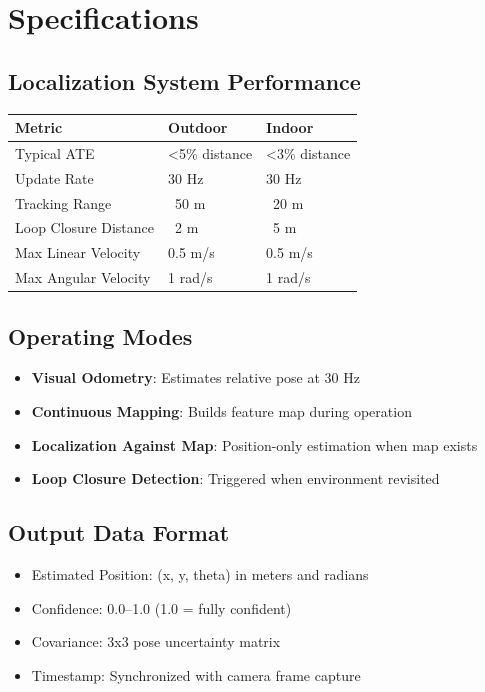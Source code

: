 %
%

\chapter{Specifications}

\section{Localization System Performance}

\begin{table}[h]
\centering
\begin{tabular}{|l|l|l|}
\hline
\textbf{Metric} & \textbf{Outdoor} & \textbf{Indoor} \\
\hline
Typical ATE & \textless 5\% distance & \textless 3\% distance \\
\hline
Update Rate & 30 Hz & 30 Hz \\
\hline
Tracking Range & ~50 m & ~20 m \\
\hline
Loop Closure Distance & ~2 m & ~5 m \\
\hline
Max Linear Velocity & 0.5 m/s & 0.5 m/s \\
\hline
Max Angular Velocity & 1 rad/s & 1 rad/s \\
\hline
\end{tabular}
\end{table}

\section{Operating Modes}

\begin{itemize}
    \item \textbf{Visual Odometry}: Estimates relative pose at 30 Hz
    \item \textbf{Continuous Mapping}: Builds feature map during operation
    \item \textbf{Localization Against Map}: Position-only estimation when map exists
    \item \textbf{Loop Closure Detection}: Triggered when environment revisited
\end{itemize}

\section{Output Data Format}

\begin{itemize}
    \item Estimated Position: (x, y, theta) in meters and radians
    \item Confidence: 0.0--1.0 (1.0 = fully confident)
    \item Covariance: 3x3 pose uncertainty matrix
    \item Timestamp: Synchronized with camera frame capture
\end{itemize}







